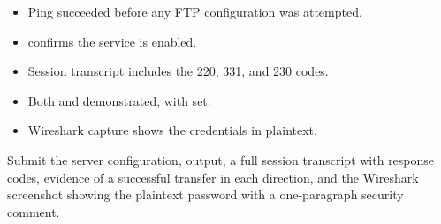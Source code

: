 \begin{verifybox}
\begin{itemize}
  \item Ping succeeded before any FTP configuration was attempted.
  \item {} confirms the service is enabled.
  \item Session transcript includes the 220, 331, and 230 codes.
  \item Both  and  demonstrated, with  set.
  \item Wireshark capture shows the credentials in plaintext.
\end{itemize}
\end{verifybox}

\begin{labdeliverable}
Submit the server configuration,  output, a full session transcript with response codes, evidence of a successful transfer in each direction, and the Wireshark screenshot showing the plaintext password with a one-paragraph security comment.
\end{labdeliverable}
